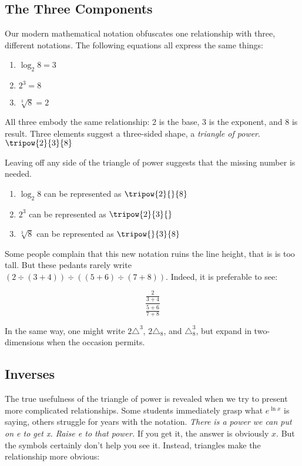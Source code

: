 

\subsection{The Three Components}
Our modern mathematical notation obfuscates one relationship with three, different notations. 
The following equations all express the same things:
\begin{enumerate}
\item $\log_2{8}=3$
\item $2^3=8$
\item $\sqrt[3]{8}=2$
\end{enumerate}

All three embody the same relationship: 2 is the base, 3 is the exponent, and 8 is result.  
Three elements suggest a three-sided shape, a \emph{triangle of power}.
$\tripow{2}{3}{8}$

Leaving off any side of the triangle of power suggests that the missing number is needed.
\begin{enumerate}
\item $\log_2{8}$ can be represented as $\tripow{2}{}{8}$
\item $2^3$ can be represented as $\tripow{2}{3}{}$
\item $\sqrt[3]{8}$ can be represented as $\tripow{}{3}{8}$
\end{enumerate}

Some people complain that this new notation ruins the line height, that is is too tall.
But these pedants rarely write\\ 
$(2\div(3+4))\div((5+6)\div(7+8))$.  Indeed, it is preferable to see:

$$\frac{\frac{2}{3+4}}{\frac{5+6}{7+8}}$$

In the same way, one might write $2\triangle^3$, $2\triangle_8$, and $\triangle^3_8$,
but expand in two-dimensions when the occasion permits.

\subsection{Inverses}
The true usefulness of the triangle of power is revealed when we try to present more
complicated relationships.  Some students immediately grasp what $e^{\ln{x}}$ is saying,
others struggle for years with the notation.  \emph{There is a power we can put on \emph{e}
to get \emph{x}.  Raise \emph{e} to that power.}  If you get it, the answer is obviously $x$.
But the symbols certainly don't help you see it.  Instead, triangles make the relationship 
more obvious: 

